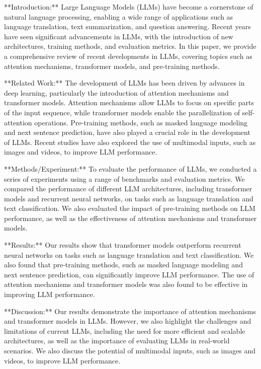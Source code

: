         **Introduction:**
Large Language Models (LLMs) have become a cornerstone of natural language processing, enabling a wide range of applications such as language translation, text summarization, and question answering. Recent years have seen significant advancements in LLMs, with the introduction of new architectures, training methods, and evaluation metrics. In this paper, we provide a comprehensive review of recent developments in LLMs, covering topics such as attention mechanisms, transformer models, and pre-training methods.

        **Related Work:**
The development of LLMs has been driven by advances in deep learning, particularly the introduction of attention mechanisms and transformer models. Attention mechanisms allow LLMs to focus on specific parts of the input sequence, while transformer models enable the parallelization of self-attention operations. Pre-training methods, such as masked language modeling and next sentence prediction, have also played a crucial role in the development of LLMs. Recent studies have also explored the use of multimodal inputs, such as images and videos, to improve LLM performance.

        **Methods/Experiment:**
To evaluate the performance of LLMs, we conducted a series of experiments using a range of benchmarks and evaluation metrics. We compared the performance of different LLM architectures, including transformer models and recurrent neural networks, on tasks such as language translation and text classification. We also evaluated the impact of pre-training methods on LLM performance, as well as the effectiveness of attention mechanisms and transformer models.

        **Results:**
Our results show that transformer models outperform recurrent neural networks on tasks such as language translation and text classification. We also found that pre-training methods, such as masked language modeling and next sentence prediction, can significantly improve LLM performance. The use of attention mechanisms and transformer models was also found to be effective in improving LLM performance.

        **Discussion:**
Our results demonstrate the importance of attention mechanisms and transformer models in LLMs. However, we also highlight the challenges and limitations of current LLMs, including the need for more efficient and scalable architectures, as well as the importance of evaluating LLMs in real-world scenarios. We also discuss the potential of multimodal inputs, such as images and videos, to improve LLM performance.

